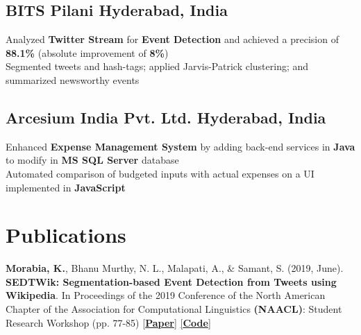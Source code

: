 \documentclass[]{Keval-resume}
\begin{document}
\subsection{BITS Pilani \hfill \normalfont H\lowercase{yderabad}, I\lowercase{ndia}}
\textbullet{} Analyzed \textbf{Twitter Stream} for \textbf{Event Detection} and achieved a precision of \textbf{88.1\%} (absolute improvement of \textbf{8\%}) \\
\textbullet{} Segmented tweets and hash-tags; applied Jarvis-Patrick clustering; and summarized newsworthy events \\
\sectionsep

\subsection{Arcesium India Pvt. Ltd. \hfill \normalfont H\lowercase{yderabad}, I\lowercase{ndia}}
\textbullet{} Enhanced \textbf{Expense Management System} by adding back-end services in \textbf{Java} to modify in \textbf{MS SQL Server} database \\
\textbullet{} Automated comparison of budgeted inputs with actual expenses on a UI implemented in \textbf{JavaScript} \\
\sectionsep


\section{Publications} 
\hrulefill
\postsectionsep 

\textbullet{} \textbf{Morabia, K.}, Bhanu Murthy, N. L., Malapati, A., \& Samant, S. (2019, June). \textbf{SEDTWik: Segmentation-based Event Detection from Tweets using Wikipedia}. In Proceedings of the 2019 Conference of the North American Chapter of the Association for Computational Linguistics \textbf{(NAACL)}: Student Research Workshop (pp. 77-85) \href{https://www.aclweb.org/anthology/N19-3011/}{[\textbf{Paper}]} \href{https://github.com/kevalmorabia97/SEDTWik-Event-Detection-from-Tweets}{[\textbf{Code}]}
\sectionsep
\end{document}
